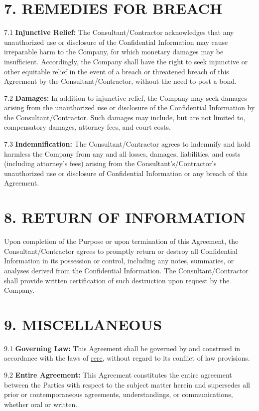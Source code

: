 \documentclass[12pt]{article}
\begin{document}
\section*{7. REMEDIES FOR BREACH}

7.1 \textbf{Injunctive Relief:} The Consultant/Contractor acknowledges that any unauthorized use or disclosure of the Confidential Information may cause irreparable harm to the Company, for which monetary damages may be insufficient. Accordingly, the Company shall have the right to seek injunctive or other equitable relief in the event of a breach or threatened breach of this Agreement by the Consultant/Contractor, without the need to post a bond.

7.2 \textbf{Damages:} In addition to injunctive relief, the Company may seek damages arising from the unauthorized use or disclosure of the Confidential Information by the Consultant/Contractor. Such damages may include, but are not limited to, compensatory damages, attorney fees, and court costs.

7.3 \textbf{Indemnification:} The Consultant/Contractor agrees to indemnify and hold harmless the Company from any and all losses, damages, liabilities, and costs (including attorney’s fees) arising from the Consultant’s/Contractor’s unauthorized use or disclosure of Confidential Information or any breach of this Agreement.

\section*{8. RETURN OF INFORMATION}

Upon completion of the Purpose or upon termination of this Agreement, the Consultant/Contractor agrees to promptly return or destroy all Confidential Information in its possession or control, including any notes, summaries, or analyses derived from the Confidential Information. The Consultant/Contractor shall provide written certification of such destruction upon request by the Company.

\section*{9. MISCELLANEOUS}

9.1 \textbf{Governing Law:} This Agreement shall be governed by and construed in accordance with the laws of \underline{rere}, without regard to its conflict of law provisions.

9.2 \textbf{Entire Agreement:} This Agreement constitutes the entire agreement between the Parties with respect to the subject matter herein and supersedes all prior or contemporaneous agreements, understandings, or communications, whether oral or written.
\end{document}
